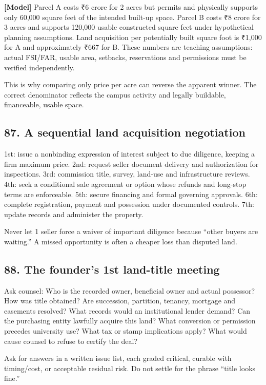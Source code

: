 \textbf{[Model]} Parcel A costs \textnormal{₹}6 crore for 2 acres but permits and physically supports only 60,000 square feet of the intended built-up space. Parcel B costs \textnormal{₹}8 crore for 3 acres and supports 120,000 usable constructed square feet under hypothetical planning assumptions. Land acquisition per potentially built square foot is \textnormal{₹}1,000 for A and approximately \textnormal{₹}667 for B. These numbers are teaching assumptions: actual FSI/FAR, usable area, setbacks, reservations and permissions must be verified independently.

This is why comparing only price per acre can reverse the apparent winner. The correct denominator reflects the campus activity and legally buildable, financeable, usable space.


\subsection{87. A sequential land acquisition negotiation}

1st: issue a nonbinding expression of interest subject to due diligence, keeping a firm maximum price. 2nd: request seller document delivery and authorization for inspections. 3rd: commission title, survey, land-use and infrastructure reviews. 4th: seek a conditional sale agreement or option whose refunds and long-stop terms are enforceable. 5th: secure financing and formal governing approvals. 6th: complete registration, payment and possession under documented controls. 7th: update records and administer the property.

Never let 1 seller force a waiver of important diligence because ``other buyers are waiting.'' A missed opportunity is often a cheaper loss than disputed land.


\subsection{88. The founder's 1st land-title meeting}

Ask counsel: Who is the recorded owner, beneficial owner and actual possessor? How was title obtained? Are succession, partition, tenancy, mortgage and easements resolved? What records would an institutional lender demand? Can the purchasing entity lawfully acquire this land? What conversion or permission precedes university use? What tax or stamp implications apply? What would cause counsel to refuse to certify the deal?

Ask for answers in a written issue list, each graded critical, curable with timing/cost, or acceptable residual risk. Do not settle for the phrase ``title looks fine.''


